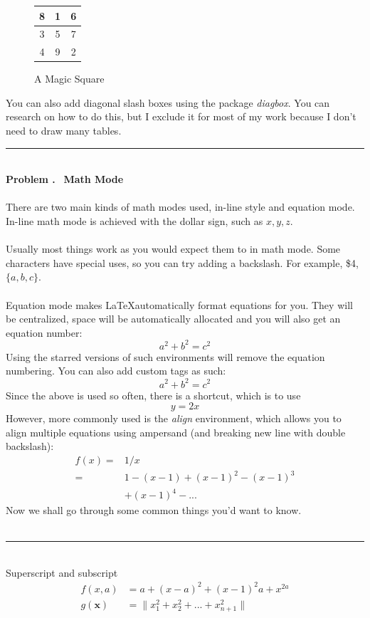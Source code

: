 \documentclass[11pt,a4paper]{article}
\newcounter{problem}
\newcommand\Problem{
  \stepcounter{problem}
  {\large \textbf{Problem \theproblem.}~}
}
\begin{document}
\begin{figure}[h]
    \centering
    \begin{tabular}{c|c|c}
        8 & 1 & 6 \\
        \hline
        3 & 5 & 7 \\
        4 & 9 & 2
    \end{tabular}
    \caption{A Magic Square}
\end{figure}

You can also add diagonal slash boxes using the package \emph{diagbox}. You can research on how to do this, but I exclude it for most of my work because I don't need to draw many tables. 


\pagebreak
\noindent\rule{\textwidth}{1pt} \\
\Problem \textbf{\large Math Mode} \\\\
There are two main kinds of math modes used, in-line style and equation mode. In-line math mode is achieved with the dollar sign, such as $x, y, z$. \\\\
Usually most things work as you would expect them to in math mode. Some characters have special uses, so you can try adding a backslash. For example, \$4, $\{a, b, c\}$. \\\\
Equation mode makes \LaTeX automatically format equations for you. They will be centralized, space will be automatically allocated and you will also get an equation number:
\begin{equation}
    a^2 + b^2 = c^2
\end{equation}
Using the starred versions of such environments will remove the equation numbering. You can also add custom tags as such:
\begin{equation*}
    a^2 + b^2 = c^2 \tag{Pythagoras Theorem}
\end{equation*}
Since the above is used so often, there is a shortcut, which is to use
\[
    y = 2x
\]
However, more commonly used is the \emph{align} environment, which allows you to align multiple equations using ampersand (and breaking new line with double backslash):
\begin{align*}
    f(x) =& 1/x \\
    =& 1 - (x-1) + (x-1)^2 - (x-1)^3 \\
    & + (x-1)^4 - ...
\end{align*}
Now we shall go through some common things you'd want to know. \\\\
\noindent\rule{\textwidth}{0.6pt} \\
{\large Superscript and subscript}
\begin{align*}
    f(x, a) &= a + (x - a)^2 + (x-1)^2a + x^{2a} \\
    g(\pmb{x}) &= \| x_1^2 + x_2^2 + ... + x_{n+1}^2 \|
\end{align*}
\end{document}
